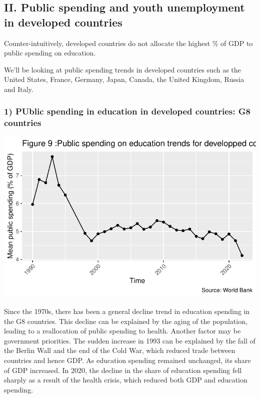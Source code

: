 \documentclass[
  letterpaper,
  DIV=11,
  numbers=noendperiod]{scrartcl}
\begin{document}
\hypertarget{ii.-public-spending-and-youth-unemployment-in-developed-countries}{%
\subsection{II. Public spending and youth unemployment in developed
countries}\label{ii.-public-spending-and-youth-unemployment-in-developed-countries}}

Counter-intuitively, developed countries do not allocate the highest \%
of GDP to public spending on education.

We'll be looking at public spending trends in developed countries such
as the United States, France, Germany, Japan, Canada, the United
Kingdom, Russia and Italy.

\hypertarget{public-spending-in-education-in-developed-countries-g8-countries}{%
\subsubsection{1) PUblic spending in education in developed countries:
G8
countries}\label{public-spending-in-education-in-developed-countries-g8-countries}}

\includegraphics{Projet-BM_files/figure-pdf/unnamed-chunk-20-1.pdf}

Since the 1970s, there has been a general decline trend in education
spending in the G8 countries. This decline can be explained by the aging
of the population, leading to a reallocation of public spending to
health. Another factor may be government priorities. The sudden increase
in 1993 can be explained by the fall of the Berlin Wall and the end of
the Cold War, which reduced trade between countries and hence GDP. As
education spending remained unchanged, its share of GDP increased. In
2020, the decline in the share of education spending fell sharply as a
result of the health crisis, which reduced both GDP and education
spending.
\end{document}
